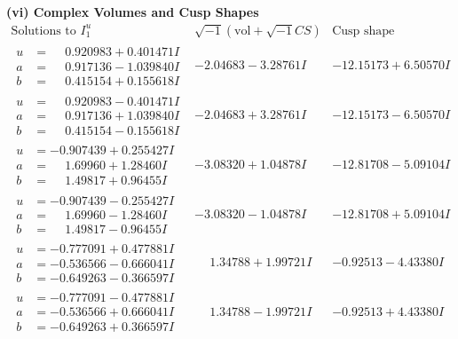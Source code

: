 \documentclass[1p]{elsarticle_modified}
\theoremstyle{definition}
\newcommand{\I}{\sqrt{-1}}
\begin{document}
\newpage\flushleft \textbf{(vi) Complex Volumes and Cusp Shapes}
$$\begin{array}{c|c|c}  
\text{Solutions to }I^u_{1}& \I (\text{vol} + \sqrt{-1}CS) & \text{Cusp shape}\\
 \hline 
\begin{aligned}
u &= \phantom{-}0.920983 + 0.401471 I \\
a &= \phantom{-}0.917136 - 1.039840 I \\
b &= \phantom{-}0.415154 + 0.155618 I\end{aligned}
 & -2.04683 - 3.28761 I & -12.15173 + 6.50570 I \\ \hline\begin{aligned}
u &= \phantom{-}0.920983 - 0.401471 I \\
a &= \phantom{-}0.917136 + 1.039840 I \\
b &= \phantom{-}0.415154 - 0.155618 I\end{aligned}
 & -2.04683 + 3.28761 I & -12.15173 - 6.50570 I \\ \hline\begin{aligned}
u &= -0.907439 + 0.255427 I \\
a &= \phantom{-}1.69960 + 1.28460 I \\
b &= \phantom{-}1.49817 + 0.96455 I\end{aligned}
 & -3.08320 + 1.04878 I & -12.81708 - 5.09104 I \\ \hline\begin{aligned}
u &= -0.907439 - 0.255427 I \\
a &= \phantom{-}1.69960 - 1.28460 I \\
b &= \phantom{-}1.49817 - 0.96455 I\end{aligned}
 & -3.08320 - 1.04878 I & -12.81708 + 5.09104 I \\ \hline\begin{aligned}
u &= -0.777091 + 0.477881 I \\
a &= -0.536566 - 0.666041 I \\
b &= -0.649263 - 0.366597 I\end{aligned}
 & \phantom{-}1.34788 + 1.99721 I & -0.92513 - 4.43380 I \\ \hline\begin{aligned}
u &= -0.777091 - 0.477881 I \\
a &= -0.536566 + 0.666041 I \\
b &= -0.649263 + 0.366597 I\end{aligned}
 & \phantom{-}1.34788 - 1.99721 I & -0.92513 + 4.43380 I \\ \hline\begin{aligned}

\end{aligned}
\end{array}$$
\end{document}
